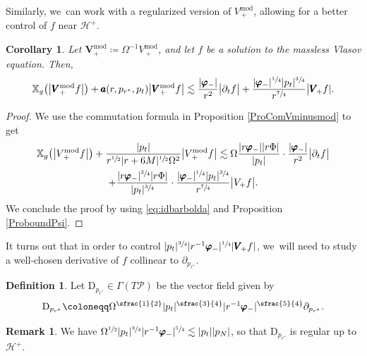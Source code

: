 \documentclass[10pt]{amsart}
\theoremstyle{plain}
\newtheorem{corollary}[proposition]{Corollary}
\theoremstyle{definition}
\newtheorem{definition}[proposition]{Definition}
\newtheorem{remark}[proposition]{Remark}
\newcommand\T{{\mathbb{X}}}
\renewcommand\H{{\mathcal{H}^+}}
\begin{document}
Similarly, we~can work with a regularized version of $V_{\, +}^{\mathrm{mod}}$, allowing for a better control of $f$ near $\mathcal{H}^+$.
\begin{corollary}\label{corVminusmod}
Let $\pmb{V}_+^{ \mathrm{mod}}\coloneqq \Omega^{-1} V_{\, +}^{\mathrm{mod}}$, and let $f$ be a solution to the massless Vlasov equation. Then,
\begin{align*}
\T_g \bigl(\big| \pmb{V}_{ +}^{ \mathrm{mod}} f \big| \bigr) + \pmb{a}(r,p_{r^*},p_t) \big| \pmb{V}_+^{ \mathrm{mod}} f \big| \lesssim \frac{|\pmb{\varphi}_-|}{r^2 } \big| \partial_t f \big|+\frac{|\pmb{\varphi}_-|^{\sfrac{1}{4}}|p_t|^{\sfrac{3}{4}}}{r^{\sfrac{7}{4}} } \big| \pmb{V}_{\! +} f|.
\end{align*}
\end{corollary}
\begin{proof}
We use the commutation formula in Proposition \ref{ProComVminusmod} to get
\begin{multline*}
\T_g \bigl(\big| V_{\, +}^{\mathrm{mod}} f \big| \bigr) + \frac{|p_t|}{r^{\sfrac{1}{2}}|r+6M|^{\sfrac{1}{2}}\Omega^2} \big| V_{\, +}^{\mathrm{mod}} f \big| \lesssim \Omega\frac{ |r\pmb{\varphi}_-||r\Phi|}{|p_t|} \cdot \frac{|\pmb{\varphi}_-|}{r^2} \big| \partial_t f \big| \\
+ \frac{|r\pmb{\varphi}_-|^{\sfrac{3}{4}}|r\Phi|}{|p_t|^{\sfrac{3}{4}}}\cdot\frac{|\pmb{\varphi}_-|^{\sfrac{1}{4}}|p_t|^{\sfrac{3}{4}}}{r^{\sfrac{7}{4}} } \big| V_+ f \big|.
\end{multline*}
We conclude the proof by using \eqref{eq:idbarbolda} and Proposition \ref{ProboundPsi}.
\end{proof}

It turns out that in order to control $|p_t|^{\sfrac{3}{4}}|r^{-1} \pmb{\varphi}_-|^{\sfrac{1}{4}} | \pmb{V}_{\! +} f|$, we~will need to study a well-chosen derivative of $f$ collinear to $\partial_{p_{r^*}}$.

\begin{definition}\label{DefDpr}
Let $\mathrm{D}_{p_{r^*}} \! \in \Gamma (T \mathcal{P})$ be the vector field given by
\[
\mathrm{D}_{p_{r^*}} \coloneqq \Omega^{\sfrac{1}{2}}|p_t|^{\sfrac{3}{4}} |r^{-1} \pmb{\varphi}_-|^{\sfrac{5}{4}} \partial_{p_{r^*}}.
\]
\end{definition}

\begin{remark}
We have $\Omega^{\sfrac{1}{2}}|p_t|^{\sfrac{3}{4}} |r^{-1} \pmb{\varphi}_-|^{\sfrac{5}{4}} \lesssim |p_t||p_N|$, so that $\mathrm{D}_{p_{r^*}}$ is regular up to $\H$.
\end{remark}
\end{document}
